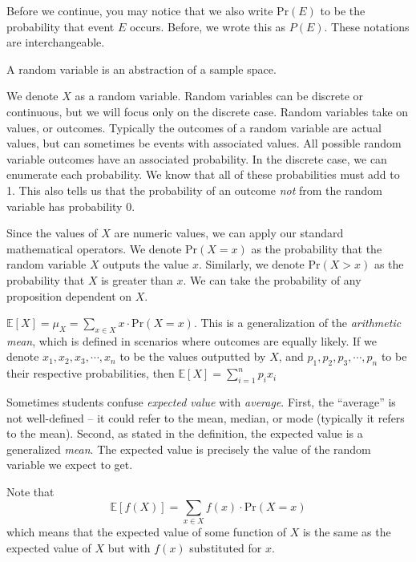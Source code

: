 \documentclass[main.tex]{subfiles}
\begin{document}
\begin{rem}
	Before we continue, you may notice that we also write \(\mathrm{Pr}(E)\) to be the probability that event \(E\) occurs. Before, we wrote this as \(P(E)\). These notations are interchangeable.
\end{rem}

\begin{defn}
	A random variable is an abstraction of a sample space.
\end{defn}

We denote \(X\) as a random variable. Random variables can be discrete or continuous, but we will focus only on the discrete case. Random variables take on values, or outcomes. Typically the outcomes of a random variable are actual values, but can sometimes be events with associated values. All possible random variable outcomes have an associated probability. In the discrete case, we can enumerate each probability. We know that all of these probabilities must add to 1. This also tells us that the probability of an outcome \textit{not} from the random variable has probability 0.

Since the values of \(X\) are numeric values, we can apply our standard mathematical operators. We denote \(\mathrm{Pr}(X = x)\) as the probability that the random variable \(X\) outputs the value \(x\). Similarly, we denote \(\mathrm{Pr}(X > x)\) as the probability that \(X\) is greater than \(x\). We can take the probability of any proposition dependent on \(X\).

\begin{defn}
	\(\mathbb{E}[X] = \mu_X = \sum_{x \in X} x \cdot \mathrm{Pr}(X = x)\). This is a generalization of the \textit{arithmetic mean}, which is defined in scenarios where outcomes are equally likely. If we denote \(x_1, x_2, x_3, \cdots, x_n\) to be the values outputted by \(X\), and \(p_1, p_2, p_3, \cdots, p_n\) to be their respective probabilities, then \(\mathbb{E}[X] = \sum_{i=1}^{n} p_i x_i\)
\end{defn}

Sometimes students confuse \textit{expected value} with \textit{average}. First, the ``average'' is not well-defined -- it could refer to the mean, median, or mode (typically it refers to the mean). Second, as stated in the definition, the expected value is a generalized \textit{mean}. The expected value is precisely the value of the random variable we expect to get.

Note that \[\mathbb{E}[f(X)] = \sum_{x \in X} f(x) \cdot \mathrm{Pr}(X = x)\] which means that the expected value of some function of \(X\) is the same as the expected value of \(X\) but with \(f(x)\) substituted for \(x\).
\end{document}
